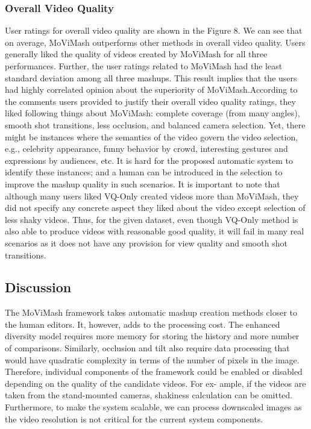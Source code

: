 \documentclass{sig-alternate}
\begin{document}
    \subsubsection{Overall Video Quality}
    User ratings for overall video quality are shown in the Figure 8. We can see that on average, MoViMash outperforms other methods in overall video quality. Users generally liked the quality of videos created by MoViMash for all three performances. Further, the user ratings related to MoViMash had the least standard deviation among all three mashups. This result implies that the users had highly correlated opinion about the superiority of MoViMash.According to the comments users provided to justify their overall video quality ratings, they liked following things about MoViMash: complete coverage (from many angles), smooth shot transitions, less occlusion, and balanced camera selection. Yet, there might be instances where the semantics of the video govern the video selection, e.g., celebrity appearance, funny behavior by crowd, interesting gestures and expressions by audiences, etc. It is hard for the proposed automatic system to identify these instances; and a human can be introduced in the selection to improve the mashup quality in such scenarios. It is important to note that although many users liked VQ-Only created videos more than MoViMash, they did not specify any concrete aspect they liked about the video except selection of less shaky videos. Thus, for the given dataset, even though VQ-Only method is also able to produce videos with reasonable good quality, it will fail in many real scenarios as it does not have any provision for view quality and smooth shot transitions.
    \subsection{Discussion}
    The MoViMash framework takes automatic mashup creation methods closer to the human editors. It, however, adds to the processing cost. The enhanced diversity model requires more memory for storing the history and more number of comparisons. Similarly, occlusion and tilt also require data processing that would have quadratic complexity in terms of the number of pixels in the image. Therefore, individual components of the framework could be enabled or disabled depending on the quality of the candidate videos. For ex- ample, if the videos are taken from the stand-mounted cameras, shakiness calculation can be omitted. Furthermore, to make the system scalable, we can process downscaled images as the video resolution is not critical for the current system components.
\end{document}
